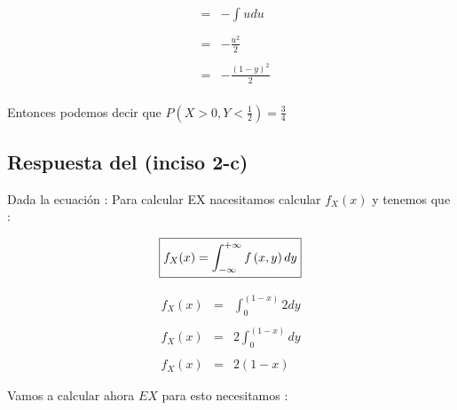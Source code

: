 \documentclass[12pt]{article}
\begin{document}
\begin{center}
\begin{equation*}
\begin{array}{c|c}
\begin{array}{l}
\begin{array}{rcl}
                        & = &  \displaystyle -\int_{}^{}u du
                        \\
                        \\
                        & = & \displaystyle - \frac{u^2}{2}
                        \\
                        \\
                        & = & \displaystyle -\frac{\left(1-y\right)^2}{2}
                    \end{array}
                \end{array}
            \end{array}
        \end{equation*}
    \end{center}

    \begin{flushleft}
        Entonces podemos decir que $P \left(X > 0 , Y  < \frac{1}{2}\right) = \frac{3}{4}$
    \end{flushleft}

    \subsection*{Respuesta del (inciso 2-c)}
    \begin{flushleft}
        Dada la ecuaci\'on :  Para calcular EX nacesitamos calcular $ f_X (x) $ y tenemos que :
    \end{flushleft}
  
    \begin{equation*}
        \fbox{$
            \displaystyle f_X(x)=\int_{-\infty}^{+\infty} f\left(x,y\right) dy
        $} 
    \end{equation*}
          
    \begin{equation}
        \begin{array}{rcl}
            f_X(x) & = & \displaystyle  \int_{0}^{\left(1-x\right)} 2 dy
            \\
            \\
            f_X(x) & = & \displaystyle 2\int_{0}^{\left(1-x\right)}dy
            \\
            \\
            f_X(x) & = & \displaystyle 2\left(1-x\right)
        \end{array}
    \end{equation}
    
    \begin{flushleft}
        Vamos a calcular ahora $EX$ para esto necesitamos  :  
    \end{flushleft}
     
\end{document}
